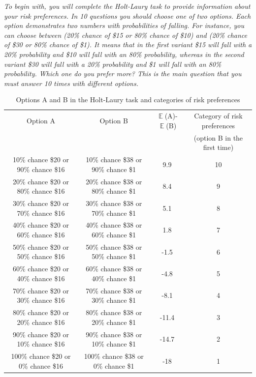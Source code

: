 \documentclass[12pt]{article}
\DeclareMathOperator{\EX}{\mathbb{E}}%
\begin{document}
	\textit{To begin with, you will complete the Holt-Laury task to provide information about your risk preferences. In 10 questions you should choose one of two options. Each option demonstrates two numbers with probabilities of falling.
		For instance, you can choose between (20\% chance of \$15 or 80\% chance of \$10) and (20\% chance of \$30 or 80\% chance of \$1). It means that in the first variant \$15 will fall with a 20\% probability and \$10 will fall with an 80\% probability, whereas in the second variant \$30 will fall with a 20\% probability and \$1 will fall with an 80\% probability. Which one do you prefer more? This is the main question that you must answer 10 times with different options.}


\begin{table}[!ht]
	\caption{Options A and B in the Holt-Laury task and categories of risk preferences}
	\label{optionsholt}
	\centering
	\footnotesize
	\begin{tabular}{|c|c|c|c|}
		\hline
		Option A &  Option B & $\EX$(A)-$\EX$(B) & Category of risk preferences\\ 
		&&&(option B in the first time)\\
		\hline
		10\% chance \$20 or 90\% chance \$16 & 10\% chance \$38 or 90\% chance \$1 & 9.9 &10\\ 
		20\% chance \$20 or 80\% chance \$16 & 20\% chance \$38 or 80\% chance \$1 & 8.4 &9\\ 
		30\% chance \$20 or 70\% chance \$16 & 30\% chance \$38 or 70\% chance \$1 & 5.1 &8\\ 
		40\% chance \$20 or 60\% chance \$16 & 40\% chance \$38 or 60\% chance \$1 &1.8 &7\\ 
		50\% chance \$20 or 50\% chance \$16 & 50\% chance \$38 or 50\% chance \$1& -1.5 &6\\ 
		60\% chance \$20 or 40\% chance \$16 & 60\% chance \$38 or 40\% chance \$1&-4.8 &5\\ 
		70\% chance \$20 or 30\% chance \$16 & 70\% chance \$38 or 30\% chance \$1& -8.1 &4\\ 
		80\% chance \$20 or 20\% chance \$16 & 80\% chance \$38 or 20\% chance \$1& -11.4 &3\\ 
		90\% chance \$20 or 10\% chance \$16 & 90\% chance \$38 or 10\% chance \$1 &-14.7 &2\\ 
		100\% chance \$20 or 0\% chance \$16 & 100\% chance \$38 or 0\% chance \$1 &-18 &1\\ 
		\hline
	\end{tabular}
\end{table}
		
\end{document}
